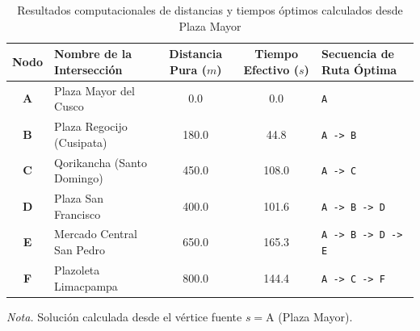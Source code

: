 \begin{table}[H]
    \centering
    \fontsize{10}{12.5}\selectfont
    \caption{Resultados computacionales de distancias y tiempos óptimos calculados desde Plaza Mayor}
    \label{tab:resultados_distancias}
    \begin{tabularx}{\textwidth}{clccX}
        \toprule
        \textbf{Nodo} & \textbf{Nombre de la Intersección} & \textbf{Distancia Pura ($m$)} & \textbf{Tiempo Efectivo ($s$)} & \textbf{Secuencia de Ruta Óptima} \\
        \midrule
        \textbf{A} & Plaza Mayor del Cusco & 0.0 & 0.0 & \texttt{A} \\
        \textbf{B} & Plaza Regocijo (Cusipata) & 180.0 & 44.8 & \texttt{A -> B} \\
        \textbf{C} & Qorikancha (Santo Domingo) & 450.0 & 108.0 & \texttt{A -> C} \\
        \textbf{D} & Plaza San Francisco & 400.0 & 101.6 & \texttt{A -> B -> D} \\
        \textbf{E} & Mercado Central San Pedro & 650.0 & 165.3 & \texttt{A -> B -> D -> E} \\
        \textbf{F} & Plazoleta Limacpampa & 800.0 & 144.4 & \texttt{A -> C -> F} \\
        \bottomrule
    \end{tabularx}
    \par\vspace{0.15cm}
    \raggedright
    \textit{Nota.} Solución calculada desde el vértice fuente $s = \text{A}$ (Plaza Mayor).
\end{table}
